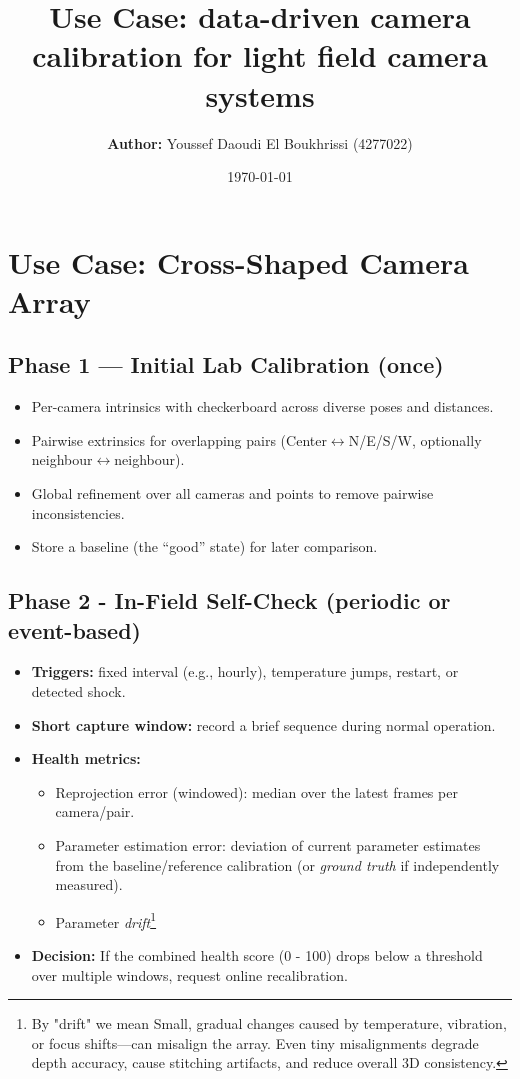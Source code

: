 \documentclass[12pt]{scrartcl}
\title{\vspace{5cm}\textbf{Use Case:} data-driven camera calibration for light field camera systems}
\author{\textbf{Author: } Youssef Daoudi El Boukhrissi (4277022)}
\date{\today}
\begin{document}
\maketitle

\newpage
{}

\section*{Use Case: Cross-Shaped Camera Array 
}

\subsection*{Phase 1 — Initial Lab Calibration (once)}
\begin{itemize}
  \item Per-camera intrinsics with checkerboard across diverse poses and distances.
  \item Pairwise extrinsics for overlapping pairs \newline(Center$\leftrightarrow$N/E/S/W, optionally neighbour$\leftrightarrow$neighbour).
  \item Global refinement over all cameras and points to remove pairwise inconsistencies.
  \item Store a baseline (the ``good'' state) for later comparison.
\end{itemize}

\subsection*{Phase 2 - In-Field Self-Check (periodic or event-based)}
\begin{itemize}
  \item \textbf{Triggers:} fixed interval (e.g., hourly), temperature jumps, restart, or detected shock.
  \item \textbf{Short capture window:} record a brief sequence during normal operation.
  \item \textbf{Health metrics:}
    \begin{itemize}
      \item Reprojection error (windowed): median over the latest frames per camera/pair.
      \item Parameter estimation error: deviation of current parameter estimates from the baseline/reference calibration (or \emph{ground truth} if independently measured).
      \item Parameter \emph{drift}\footnote{By "drift" we mean Small, gradual changes caused by temperature, vibration, or focus shifts—can misalign the array. Even tiny misalignments degrade depth accuracy, cause stitching artifacts, and reduce overall 3D consistency.}
    \end{itemize}
  \item \textbf{Decision:} If the combined health score (0 - 100) drops below a threshold over multiple windows, request online recalibration.
\end{itemize}
\end{document}
